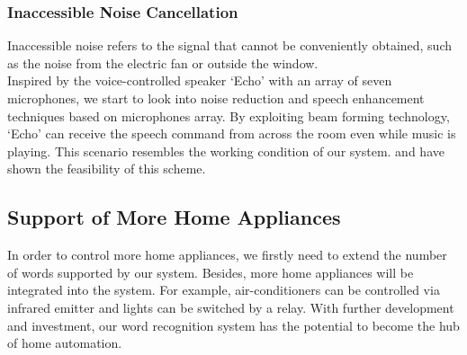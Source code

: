 
\subsubsection{Inaccessible Noise Cancellation}

Inaccessible noise refers to the signal that cannot be conveniently obtained, such as the noise from the electric fan or outside the window.\\

Inspired by the voice-controlled speaker `Echo' with an array of seven microphones, we start to look into noise reduction and speech enhancement techniques based on microphones array. By exploiting beam forming technology, `Echo' can receive the speech command from across the room even while music is playing. This scenario resembles the working condition of our system. \cite{mccowan2003microphone} and \cite{spalt2011background} have shown the feasibility of this scheme.


\subsection{Support of More Home Appliances}
In order to control more home appliances, we firstly need to extend the number of words supported by our system. Besides, more home appliances will be integrated into the system. For example, air-conditioners can be controlled via infrared emitter and lights can be switched by a relay. With further development and investment, our word recognition system has the potential to become the hub of home automation.
